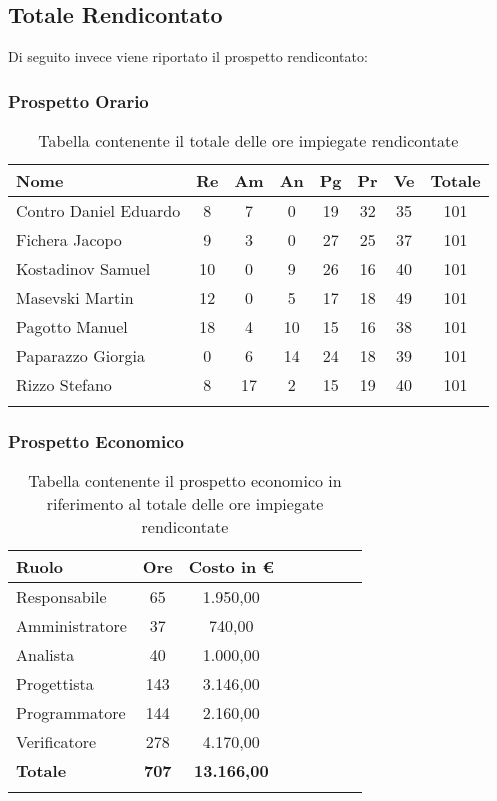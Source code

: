 \documentclass[../piano_di_progetto.tex]{subfiles}
\begin{document}
\subsection{Totale Rendicontato}
Di seguito invece viene riportato il prospetto rendicontato:

\subsubsection{Prospetto Orario}

\begin{center}
	\begin{longtable}{|l|c|c|c|c|c|c|c|}
		\hline
		\rowcolor{lightgray}
		\textbf{Nome} & \textbf{Re} & \textbf{Am} & \textbf{An} & \textbf{Pg}  & \textbf{Pr}   & \textbf{Ve} & \textbf{Totale} \\

		\hline
			Contro Daniel Eduardo & 8 & 7 & 0 & 19 & 32 & 35 & 101 \\
		\hline
			Fichera Jacopo & 9 & 3 & 0 & 27 & 25 & 37 & 101 \\
		\hline
			Kostadinov Samuel & 10 & 0 & 9 & 26 & 16 & 40 & 101 \\			
		\hline
			Masevski Martin & 12 & 0 & 5 & 17 & 18 & 49 & 101 \\
		\hline
			Pagotto Manuel & 18 & 4 & 10 & 15 & 16 & 38 & 101 \\			
		\hline
			Paparazzo Giorgia & 0 & 6 & 14 & 24 & 18 & 39 & 101 \\
		\hline
			Rizzo Stefano & 8 & 17 & 2 & 15 & 19 & 40 & 101 \\
		\hline	

		\caption{Tabella contenente il totale delle ore impiegate rendicontate}
	\end{longtable}
\end{center}

\subsubsection{Prospetto Economico}

\begin{center}
	\begin{longtable}{|l|c|c|c|c|c|c|c|}
		\hline
		\rowcolor{lightgray}
		\textbf{Ruolo} & \textbf{Ore} & \textbf{Costo in €}\\

		\hline
		Responsabile & 65 & 1.950,00 \\
		\hline
		Amministratore & 37 & 740,00 \\
		\hline
		Analista & 40 & 1.000,00 \\
		\hline
		Progettista & 143 & 3.146,00 \\
		\hline
		Programmatore & 144 & 2.160,00 \\
		\hline
		Verificatore & 278 & 4.170,00 \\
		\hline
		\textbf{Totale} & \textbf{707} & \textbf{13.166,00}\\
		\hline
		\caption{Tabella contenente il prospetto economico in riferimento al totale delle ore impiegate rendicontate}
	\end{longtable}
\end{center}
\end{document}
